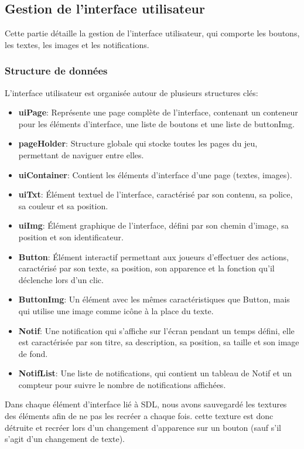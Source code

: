 \documentclass[11pt,a4paper]{article}
\begin{document}
\subsection{Gestion de l'interface utilisateur}
Cette partie détaille la gestion de l'interface utilisateur, qui comporte les boutons, les textes, les images et les notifications.

\subsubsection{Structure de données} 
L'interface utilisateur est organisée autour de plusieurs structures clés:\\
\begin{itemize}
    \item \textbf{uiPage}: Représente une page complète de l'interface, contenant un conteneur pour les éléments d'interface, une liste de boutons et une liste de buttonImg.
    \item \textbf{pageHolder}: Structure globale qui stocke toutes les pages du jeu, permettant de naviguer entre elles.
    \item \textbf{uiContainer}: Contient les éléments d'interface d'une page (textes, images).
    \item \textbf{uiTxt}: Élément textuel de l'interface, caractérisé par son contenu, sa police, sa couleur et sa position.
    \item \textbf{uiImg}: Élément graphique de l'interface, défini par son chemin d'image, sa position et son identificateur.
    \item \textbf{Button}: Élément interactif permettant aux joueurs d'effectuer des actions, caractérisé par son texte, sa position, son apparence et la fonction qu'il déclenche lors d'un clic.
    \item \textbf{ButtonImg}: Un élément avec les mêmes caractéristiques que Button, mais qui utilise une image comme icône à la place du texte.
    \item \textbf{Notif}: Une notification qui s'affiche sur l'écran pendant un temps défini, elle est caractérisée par son titre, sa description, sa position, sa taille et son image de fond.
    \item \textbf{NotifList}: Une liste de notifications, qui contient un tableau de Notif et un compteur pour suivre le nombre de notifications affichées.
\end{itemize}
Dans chaque élément d’interface lié à SDL, nous avons sauvegardé les textures des éléments afin de ne pas les recréer a chaque fois. cette texture est donc détruite et recréer lors d'un changement d'apparence sur un bouton (sauf s’il s’agit d'un changement de texte).
\end{document}
